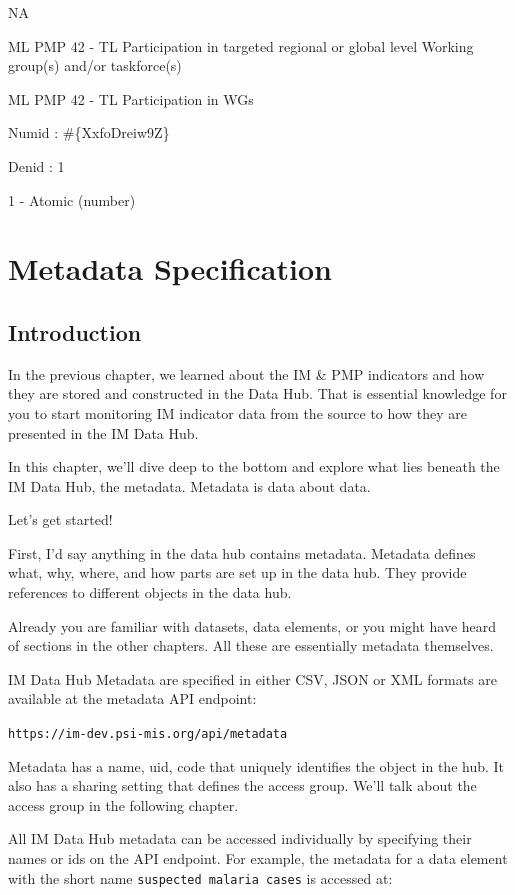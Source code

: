 \documentclass[]{book}
\begin{document}
NA

ML PMP 42 - TL Participation in targeted regional or global level Working group(s) and/or taskforce(s)

ML PMP 42 - TL Participation in WGs

Numid : \#\{XxfoDreiw9Z\}

Denid : 1

1 - Atomic (number)

\hypertarget{meta}{%
\chapter{Metadata Specification}\label{meta}}

\hypertarget{introduction-2}{%
\section{Introduction}\label{introduction-2}}

In the previous chapter, we learned about the IM \& PMP indicators and how they are stored and constructed in the Data Hub. That is essential knowledge for you to start monitoring IM indicator data from the source to how they are presented in the IM Data Hub.

In this chapter, we'll dive deep to the bottom and explore what lies beneath the IM Data Hub, the metadata. Metadata is data about data.

Let's get started!

First, I'd say anything in the data hub contains metadata. Metadata defines what, why, where, and how parts are set up in the data hub. They provide references to different objects in the data hub.

Already you are familiar with datasets, data elements, or you might have heard of sections in the other chapters. All these are essentially metadata themselves.

IM Data Hub Metadata are specified in either CSV, JSON or XML formats are available at the metadata API endpoint:

\texttt{https://im-dev.psi-mis.org/api/metadata}

Metadata has a name, uid, code that uniquely identifies the object in the hub. It also has a sharing setting that defines the access group. We'll talk about the access group in the following chapter.

All IM Data Hub metadata can be accessed individually by specifying their names or ids on the API endpoint. For example, the metadata for a data element with the short name \texttt{suspected\ malaria\ cases} is accessed at:
\end{document}
